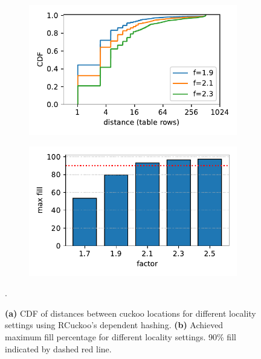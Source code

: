 \begin{figure}[t]
    \centering
    \begin{subfigure}{0.3\linewidth}
        \includegraphics[width=0.99\linewidth]{fig/hash_factor.pdf}
    \end{subfigure}
    \begin{subfigure}{0.3\linewidth}
        \includegraphics[width=0.99\linewidth]{fig/hash_fill.pdf}
    \end{subfigure}.
    \vspace{-1em}
    \caption{
    \textbf{(a)} CDF of distances between cuckoo locations for different locality settings using RCuckoo's dependent hashing.
    \textbf{(b)} Achieved maximum fill percentage for different locality settings. 90\% fill indicated by dashed red line.
    }
    \label{fig:locality-hashing}

\end{figure}

